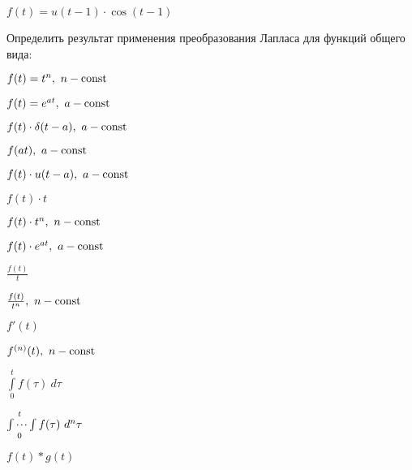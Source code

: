 	\begin{enumtasks}

		\item \( f(t) = u(t-1) \cdot \cos(t-1) \)

	\end{enumtasks}

	\vspace{25pt}

	Определить результат применения преобразования Лапласа для функций общего вида:

	\begin{multicols}{3}
		\begin{enumtasks}

			\item \( f(t) = t^n, ~ n - \mathrm{const} \)
			\item \( f(t) = e^{at}, ~ a - \mathrm{const} \)
			\item \( f(t) \cdot \delta(t-a), ~ a - \mathrm{const} \)
			\item \( f(at), ~ a - \mathrm{const} \)
			\item \( f(t) \cdot u(t-a), ~ a - \mathrm{const} \)
			\item \( f(t) \cdot t \)
			\item \( f(t) \cdot t^{n}, ~ n - \mathrm{const} \)
			\item \( f(t) \cdot e^{at}, ~ a - \mathrm{const} \)
			\item \( \frac{f(t)}{t} \)
			\item \( \frac{f(t)}{t^n}, ~ n - \mathrm{const} \)
			\item \( f'(t) \)
			\item \( f^{(n)}(t), ~ n - \mathrm{const} \)
			\item \( \int\limits_0^t f(\tau) ~ d \tau \)
			\item \( \idotsint\limits_0^t f(\tau) ~ d^n \tau \)
			\item \( f(t) * g(t) \)

		\end{enumtasks}
	\end{multicols}



